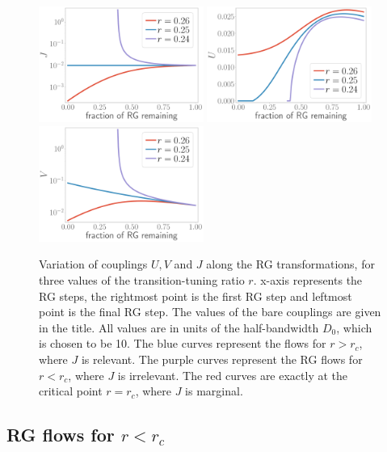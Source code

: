 \documentclass[reprint,superscriptaddress,floatfix]{revtex4-2}
\begin{document}
\begin{figure}[!htb]
	\centering
	\includegraphics[width=0.48\textwidth]{J_Ub.pdf}
	\includegraphics[width=0.48\textwidth]{U_Ub.pdf}
	\includegraphics[width=0.48\textwidth]{V_Ub.pdf}
	\caption{Variation of couplings \(U,V\) and \(J\) along the RG transformations, for three values of the transition-tuning ratio \(r\). x-axis represents the RG steps, the rightmost point is the first RG step and leftmost point is the final RG step. The values of the bare couplings are given in the title. All values are in units of the half-bandwidth \(D_0\), which is chosen to be 10. The blue curves represent the flows for \(r > r_c\), where \(J\) is relevant. The purple curves represent the RG flows for \(r < r_c\), where \(J\) is irrelevant. The red curves are exactly at the critical point \(r = r_c\), where \(J\) is marginal.}
	\label{rg-flow}
\end{figure}

\subsection{RG flows for \(r < r_c\)}
\end{document}
